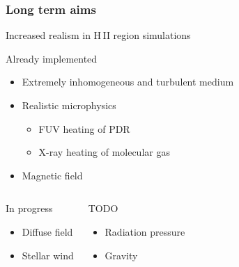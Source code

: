 \documentclass{beamer}
\begin{document}
\begin{frame}
  \frametitle{Long term aims}
  \begin{alertblock}{Increased realism in H\,II region simulations}
  \end{alertblock}
  \begin{block}{Already implemented}
    \begin{itemize}
    \item Extremely inhomogeneous and turbulent medium
    \item Realistic microphysics
      \begin{itemize}
      \item FUV heating of PDR
      \item X-ray heating of molecular gas
      \end{itemize}
    \item Magnetic field
    \end{itemize}
  \end{block}
  \begin{columns}
    \begin{block}{In progress}
      \begin{itemize}
      \item Diffuse field
      \item Stellar wind
      \end{itemize}
    \end{block}
    \begin{block}{TODO}
      \begin{itemize}
      \item Radiation pressure
      \item Gravity
      \end{itemize}
    \end{block}
  \end{columns}
\end{frame}
\end{document}
